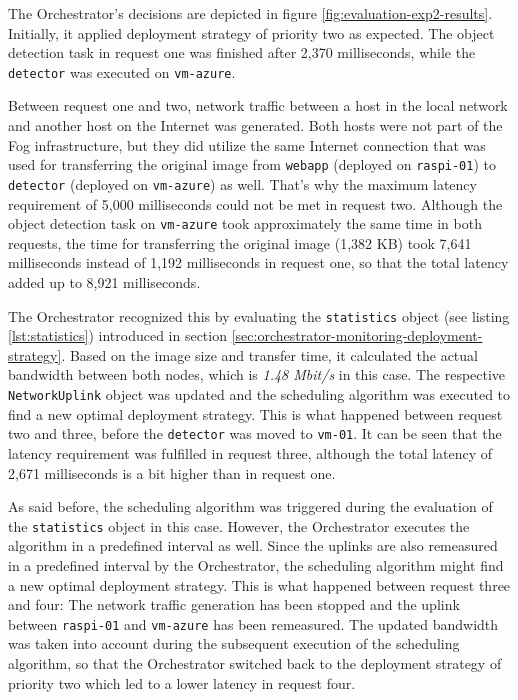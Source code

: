 The Orchestrator's decisions are depicted in figure \ref{fig:evaluation-exp2-results}. 
Initially, it applied deployment strategy of priority two as expected.
The object detection task in request one was finished after 2,370 milliseconds, while the \texttt{detector} was executed on \texttt{vm-azure}.

Between request one and two, network traffic between a host in the local network and another host on the Internet was generated.
Both hosts were not part of the Fog infrastructure, but they did utilize the same Internet connection that was used for transferring the original image from \texttt{webapp} (deployed on \texttt{raspi-01}) to \texttt{detector} (deployed on \texttt{vm-azure}) as well.
That's why the maximum latency requirement of 5,000 milliseconds could not be met in request two.
Although the object detection task on \texttt{vm-azure} took approximately the same time in both requests, the time for transferring the original image (1,382 KB) took 7,641 milliseconds instead of 1,192 milliseconds in request one, so that the total latency added up to 8,921 milliseconds.

The Orchestrator recognized this by evaluating the \texttt{statistics} object (see listing \ref{lst:statistics}) introduced in section \ref{sec:orchestrator-monitoring-deployment-strategy}.
Based on the image size and transfer time, it calculated the actual bandwidth between both nodes, which is \textit{1.48 Mbit/s} in this case.
The respective \texttt{NetworkUplink} object was updated and the scheduling algorithm was executed to find a new optimal deployment strategy.
This is what happened between request two and three, before the \texttt{detector} was moved to \texttt{vm-01}.
It can be seen that the latency requirement was fulfilled in request three, although the total latency of 2,671 milliseconds is a bit higher than in request one.

As said before, the scheduling algorithm was triggered during the evaluation of the \texttt{statistics} object in this case.
However, the Orchestrator executes the algorithm in a predefined interval as well.
Since the uplinks are also remeasured in a predefined interval by the Orchestrator, the scheduling algorithm might find a new optimal deployment strategy.
This is what happened between request three and four:
The network traffic generation has been stopped and the uplink between \texttt{raspi-01} and \texttt{vm-azure} has been remeasured.
The updated bandwidth was taken into account during the subsequent execution of the scheduling algorithm, so that the Orchestrator switched back to the deployment strategy of priority two which led to a lower latency in request four.

